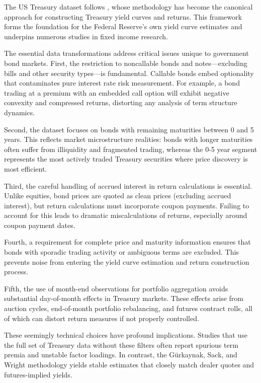 \documentclass{article}
\begin{document}
\begin{appendices}
The US Treasury dataset follows \cite{Gurkaynak2007}, whose methodology has become the canonical approach for constructing Treasury yield curves and returns. This framework forms the foundation for the Federal Reserve's own yield curve estimates and underpins numerous studies in fixed income research.

The essential data transformations address critical issues unique to government bond markets. First, the restriction to noncallable bonds and notes—excluding bills and other security types—is fundamental. Callable bonds embed optionality that contaminates pure interest rate risk measurement. For example, a bond trading at a premium with an embedded call option will exhibit negative convexity and compressed returns, distorting any analysis of term structure dynamics.

Second, the dataset focuses on bonds with remaining maturities between 0 and 5 years. This reflects market microstructure realities: bonds with longer maturities often suffer from illiquidity and fragmented trading, whereas the 0-5 year segment represents the most actively traded Treasury securities where price discovery is most efficient.

Third, the careful handling of accrued interest in return calculations is essential. Unlike equities, bond prices are quoted as clean prices (excluding accrued interest), but return calculations must incorporate coupon payments. Failing to account for this leads to dramatic miscalculations of returns, especially around coupon payment dates.

Fourth, a requirement for complete price and maturity information ensures that bonds with sporadic trading activity or ambiguous terms are excluded. This prevents noise from entering the yield curve estimation and return construction process.

Fifth, the use of month-end observations for portfolio aggregation avoids substantial day-of-month effects in Treasury markets. These effects arise from auction cycles, end-of-month portfolio rebalancing, and futures contract rolls, all of which can distort return measures if not properly controlled.

These seemingly technical choices have profound implications. Studies that use the full set of Treasury data without these filters often report spurious term premia and unstable factor loadings. In contrast, the Gürkaynak, Sack, and Wright methodology yields stable estimates that closely match dealer quotes and futures-implied yields.


\end{appendices}
\end{document}
